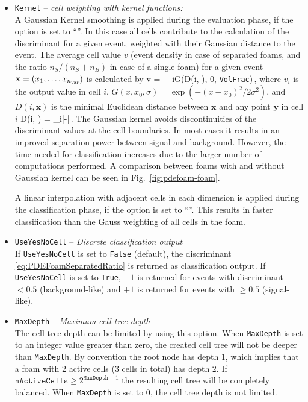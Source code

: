 \begin{itemize}
\item \texttt{Kernel} -- {\em cell weighting with kernel functions:}\\
\label{sec:PDEFoam-kernel}%
A Gaussian Kernel smoothing is applied during the evaluation
phase, if the option  is set to ``''.  In this
case all cells contribute to the calculation of the discriminant for a
given event, weighted with their Gaussian distance to the
event.  The average cell value $v$ (event density in case of
separated foams, and the ratio
$n_S/(n_S+n_B)$ in case of a single foam)
for a given event ${\mathbf x}=(x_1, \ldots, x_{n_\text{var}})$ is calculated by
%
\beq
  v = %
           {\sum_{ i}G(D(i, ), 0, \texttt{VolFrac})}\,,
\eeq
%
where $v_i$ is the output value in cell $i$, 
$G(x, x_0, \sigma) = \exp(-(x-x_0)^2/2\sigma^2)$, and $D(i,\mathbf{x})$ 
is the minimal Euclidean distance between $\mathbf{x}$ and any point
$\mathbf{y}$ in cell $i$
%
\beq
  D(i, ) = \min_{\in{}i}|-|\,.
\eeq
%
The Gaussian kernel avoids discontinuities of the discriminant
values at the cell boundaries.  In most cases it results in an
improved separation power between signal and background.  However, the
time needed for classification increases due to the larger number of
computations performed.  A comparison between foams with and without
Gaussian kernel can be seen in Fig.~\ref{fig:pdefoam-foam}.

A linear interpolation with adjacent cells in each dimension is applied during 
the classification phase, if the option  is set to ``''.
This results in faster classification than the Gauss weighting of all cells
in the foam.

\item \texttt{UseYesNoCell} -- {\em Discrete classification output}\\
  If \texttt{UseYesNoCell} is set to \texttt{False} (default), the
  discriminant \eqref{eq:PDEFoamSeparatedRatio} is returned as
  classification output.  If \texttt{UseYesNoCell} is set to
  \texttt{True}, $-1$ is returned for events with discriminant $<0.5$
  (background-like) and $+1$ is returned for events with $\geq 0.5$
  (signal-like).

\item \texttt{MaxDepth} -- {\em Maximum cell tree depth}\\
  The cell tree depth can be limited by using this option.  When
  \texttt{MaxDepth} is set to an integer value greater than zero, the
  created cell tree will not be deeper than \texttt{MaxDepth}.  By
  convention the root node has depth $1$, which implies that a foam
  with $2$ active cells ($3$ cells in total) has depth $2$.  If
  $\texttt{nActiveCells} \geq 2^{\texttt{MaxDepth}-1}$ the resulting
  cell tree will be completely balanced.  When \texttt{MaxDepth} is
  set to $0$, the cell tree depth is not limited.


\end{itemize}
